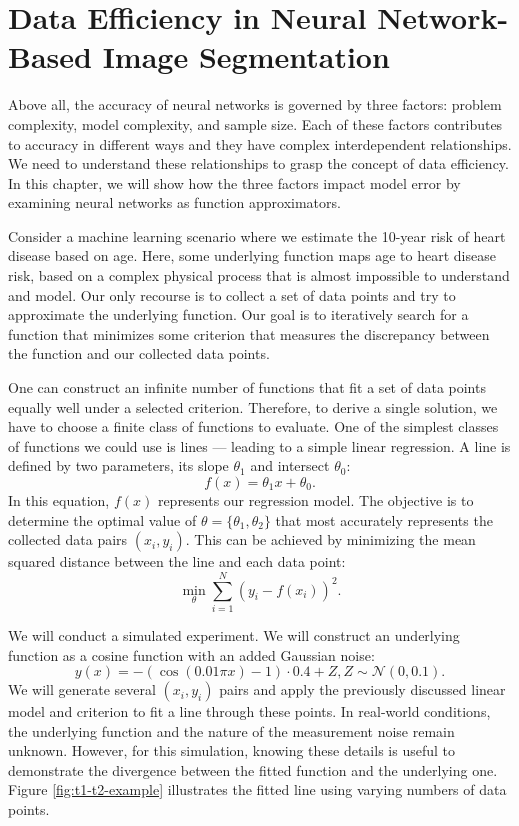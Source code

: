 
\chapter{Data Efficiency in Neural Network-Based Image Segmentation}
\label{chap:data-efficiency}

Above all, the accuracy of neural networks is governed by three factors: problem complexity, model complexity, and sample size. Each of these factors contributes to accuracy in different ways and they have complex interdependent relationships. We need to understand these relationships to grasp the concept of data efficiency.  In this chapter, we will show how the three factors impact model error by examining neural networks as function approximators.

Consider a machine learning scenario where we estimate the 10-year risk of heart disease based on age. Here, some underlying function maps age to heart disease risk, based on a complex physical process that is almost impossible to understand and model. Our only recourse is to collect a set of data points and try to approximate the underlying function. Our goal is to iteratively search for a function that minimizes some criterion that measures the discrepancy between the function and our collected data points.

One can construct an infinite number of functions that fit a set of data points equally well under a selected criterion. Therefore, to derive a single solution, we have to choose a finite class of functions to evaluate. One of the simplest classes of functions we could use is lines --- leading to a simple linear regression. A line is defined by two parameters, its slope $\theta_1$ and intersect $\theta_0$:
\begin{equation}
	f(x) = \theta_1 x + \theta_0.
\end{equation}
In this equation, $f(x)$ represents our regression model. The objective is to determine the optimal value of $\theta = \{ \theta_1, \theta_2 \}$ that most accurately represents the collected data pairs $(x_i, y_i)$. This can be achieved by minimizing the mean squared distance between the line and each data point:
\begin{equation}
	\min_{\theta} \sum_{i=1}^N (y_i - f(x_i))^2.
\end{equation}

We will conduct a simulated experiment. We will construct an underlying function as a cosine function with an added Gaussian noise:
\begin{equation}
	y(x) = -(\cos(0.01 \pi x) - 1) \cdot 0.4 + Z, Z \sim \mathcal{N}(0, 0.1).
\end{equation}
We will generate several $(x_i, y_i)$ pairs and apply the previously discussed linear model and criterion to fit a line through these points. In real-world conditions, the underlying function and the nature of the measurement noise remain unknown. However, for this simulation, knowing these details is useful to demonstrate the divergence between the fitted function and the underlying one. Figure \ref{fig:t1-t2-example} illustrates the fitted line using varying numbers of data points.

